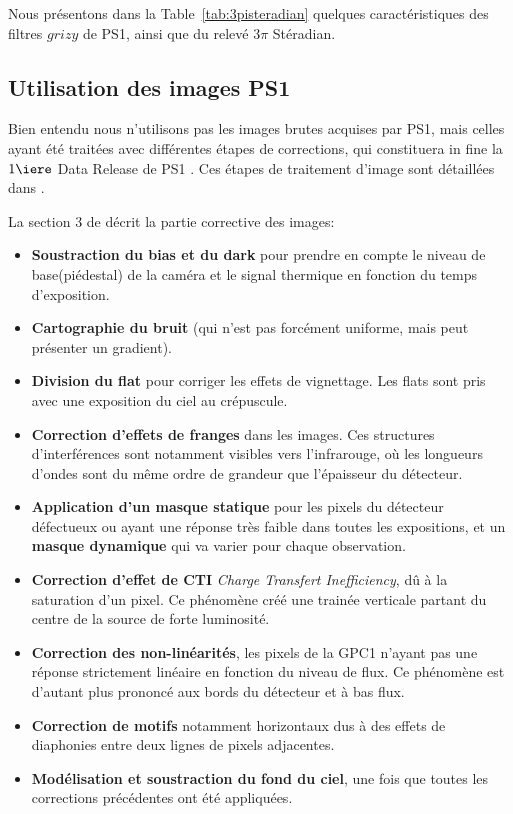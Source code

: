 \documentclass[../main/main.tex]{subfiles}
\begin{document}
Nous présentons dans la Table~\ref{tab:3pisteradian} quelques
caractéristiques des filtres $grizy$ de PS1, ainsi que du relevé $3\pi$
Stéradian.

\subsection{Utilisation des images PS1}
\label{ssec:preprocessps1}

Bien entendu nous n'utilisons pas les images brutes acquises par PS1,
mais celles ayant été traitées avec différentes étapes de corrections,
qui constituera in fine la $1\iere$ Data Release de PS1 \citep{ChambersPanstarrs,Flewelling2020}.
Ces étapes de traitement d'image sont détaillées dans
\citet{Waters2020}.

La section 3 de \citet{Waters2020} décrit la partie corrective des
images:

\begin{itemize}[label=$\diamondsuit$]
  \itemsep0em 
   \item \textbf{Soustraction du bias et du dark} pour prendre en compte
     le niveau de base(piédestal) de la caméra et le signal thermique en fonction du temps d'exposition.
   \item \textbf{Cartographie du bruit} (qui n'est pas forcément uniforme, mais peut
     présenter un gradient).
   \item \textbf{Division du flat} pour corriger les effets de vignettage. Les
     flats sont pris avec une exposition du ciel au
     crépuscule.
   \item  \textbf{Correction d'effets de franges} dans les images. Ces structures
     d'interférences sont notamment visibles vers l'infrarouge, où les
     longueurs d'ondes sont du même ordre de grandeur que l'épaisseur du
     détecteur.
   \item \textbf{Application d'un masque statique} pour les pixels du détecteur
     défectueux ou ayant une réponse très faible dans toutes les expositions, et un \textbf{masque dynamique}
     qui va varier pour chaque observation.
   \item \textbf{Correction d'effet de CTI} \textit{Charge Transfert Inefficiency}, dû à la saturation d'un
     pixel. Ce phénomène créé une trainée verticale partant du centre de
     la source de forte luminosité.
   \item \textbf{Correction des non-linéarités}, les pixels de la GPC1
     n'ayant pas une réponse strictement linéaire en fonction du niveau
     de flux. Ce phénomène est d'autant plus prononcé aux bords du
     détecteur et à bas flux.
   \item \textbf{Correction de motifs} notamment horizontaux dus à des
     effets de 
     diaphonies entre deux lignes de pixels adjacentes.
   \item \textbf{Modélisation et soustraction du fond du ciel}, une fois
     que toutes les corrections précédentes ont été appliquées.
\end{itemize}
\end{document}
